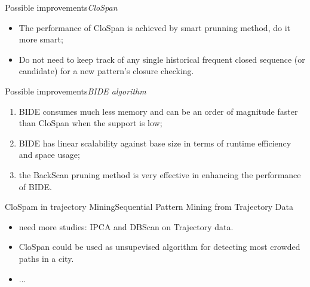 \documentclass[12pt]{beamer}
\begin{document}
\begin{frame}{Possible improvements}{{\it CloSpan}}
\begin{itemize}
\item The performance of CloSpan is achieved by smart prunning method, do it more smart;
\item Do not need to keep track of any single historical frequent closed sequence (or candidate) for a new pattern’s closure checking.
\end{itemize}
\end{frame}

\begin{frame}{Possible improvements}{{\it BIDE algorithm}}
\begin{enumerate}
\item BIDE consumes much less memory and can be an order of magnitude faster than CloSpan when the support is low;
\item BIDE has linear scalability against base size in terms of runtime efficiency and space usage;
\item the BackScan pruning method is very effective in enhancing the performance of BIDE.
\end{enumerate}
\end{frame}

\begin{frame}{CloSpam in trajectory Mining}{Sequential Pattern Mining from Trajectory Data}
\begin{itemize}
  \item need more studies: IPCA and DBScan on Trajectory data.
  \item CloSpan could be used as unsupevised algorithm for detecting most crowded paths in a city.
  \item ...
\end{itemize}
\end{frame}
\end{document}
